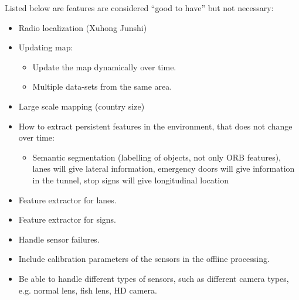 Listed below are features are considered ``good to have'' but not
necessary:

\begin{itemize}
\item Radio localization  (Xuhong  Junshi)
\item Updating map:
  \begin{itemize}
  \item Update the map dynamically over time.
  \item Multiple data-sets from the same area.
  \end{itemize}
\item Large scale mapping (country size)
\item How to extract persistent features in the environment, that does
  not change over time:
  \begin{itemize}
  \item  Semantic segmentation (labelling of objects, not only ORB
    features), lanes will give lateral information, emergency doors
    will give information in the tunnel, stop signs will give
    longitudinal location
  \end{itemize}
\item Feature extractor for lanes.
\item Feature extractor for signs.
\item Handle sensor failures.
\item Include calibration parameters of the sensors in the offline processing.
\item Be able to handle different types of sensors, such as different camera types, e.g. normal lens, fish lens, HD camera.
\end{itemize}


